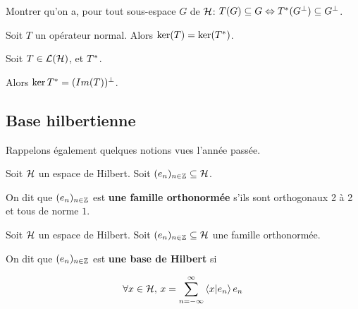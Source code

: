 \begin{exercice}
	Montrer qu'on a, pour tout sous-espace $G$ de $\mathcal{H}$:
	$T(G) \subseteq G \Leftrightarrow T^{*}(G^{\perp}) \subseteq G^{\perp}$.
\end{exercice}

\begin{exercice}
	Soit $T$ un opérateur normal. Alors $\ker(T) = \ker(T^{*})$.
\end{exercice}

\begin{exercice}
	\label{ex:ker_image_ortho_adjointe}
	Soit $T \in \mathcal{L}(\mathcal{H})$, et $T^{*}$.

	Alors $\ker{T^{*}} = (Im(T))^{\perp}$.
\end{exercice}

\subsection{Base hilbertienne}

Rappelons également quelques notions vues l'année passée.

\begin{definition}
	Soit $\mathcal{H}$ un espace de Hilbert.
	Soit $(e_{n})_{n \in \mathbb{Z}} \subseteq \mathcal{H}$.

	On dit que $(e_{n})_{n \in \mathbb{Z}}$ est \textbf{une famille
	orthonormée} s'ils sont orthogonaux 2 à 2 et tous de norme $1$.
\end{definition}

\begin{definition}
	Soit $\mathcal{H}$ un espace de Hilbert.
	Soit $(e_{n})_{n \in \mathbb{Z}} \subseteq \mathcal{H}$ une famille
	orthonormée.

	On dit que $(e_{n})_{n \in \mathbb{Z}}$ est \textbf{une base de Hilbert} si

	\begin{equation}
	\forall x \in \mathcal{H}, \, x = \displaystyle \sum_{n = -\infty}^{\infty}
	\bra{x}\ket{e_{n}} e_{n}
	\end{equation}
\end{definition}


